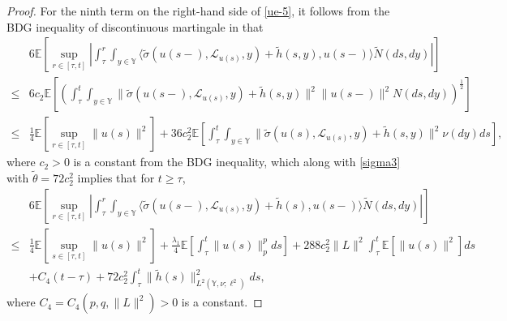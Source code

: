 \documentclass[11pt]{article}
\numberwithin{equation}{section}
\theoremstyle{plain}
\begin{document}
\begin{proof}
 For the ninth term on the right-hand side of \eqref{ue-5},
 it follows from the BDG inequality of discontinuous martingale in \cite[Theorem 3.50]{PZ2007} that
  \begin{align}\label{ue-8}
        & 
        6 \mathbb{E}
                \left[ \sup_{r \in [\tau, t]}
                       \left| 
                             \int_{\tau}^{r}
                              \int_{y \in \mathbb{Y}}
                \langle
              \widetilde{\sigma}(u(s-), \mathcal{L}_{u(s)},y) +  \widetilde{h}(s,y), 
                       u(s-) \rangle
               \widetilde{N}(ds, dy) 
                        \right|
                \right]   
           \nonumber \\
            \le & 6 c_2 
          \mathbb{E}
                \left[   \left (
                             \int_{\tau}^{t}
                              \int_{y \in \mathbb{Y}}
              \|
              \widetilde{\sigma}(u(s-), \mathcal{L}_{u(s)},y) +  \widetilde{h}(s,y)\|^2
                       \|u(s-) \|^2
              {N}(ds, dy)  
              \right )^{\frac 12}
                \right]   
             \nonumber \\
      \le & \frac{1}{4}
           \mathbb{E}
              \left[ \sup_{r \in [\tau, t]} \| u(s)\|^2 \right]
           + 36 c_2^2 \mathbb{E}
               \left[  
                         \int_{\tau}^{t} \int_{y \in \mathbb{Y} }
                               \| \widetilde{\sigma}(u(s), \mathcal{L}_{u(s)},y) + \widetilde{h}(s,y) \|^2
                         \nu (dy)ds
               \right],
  \end{align}
 where $c_2>0$ is a constant
 from the BDG inequality,
 which along with 
  \eqref{sigma3} with $\tilde{\theta}=72 c_2^2  $ implies that for $t\ge \tau$,
 \begin{align}\label{ue-9}
            & 
        6 \mathbb{E}
                \left[ \sup_{r \in [\tau, t]}
                       \left| 
                             \int_{\tau}^{r}
                              \int_{y \in \mathbb{Y}}
                \langle
              \widetilde{\sigma}(u(s-), \mathcal{L}_{u(s)},y) +  \widetilde{h}(s), 
                       u(s-) \rangle
               \widetilde{N}(ds, dy) 
                        \right|
                \right]   
           \nonumber \\
        \le & \frac{1}{4}
           \mathbb{E}
              \left[ \sup_{s \in [\tau, t]} \| u(s)\|^2 \right]
          + \frac{\lambda_1}{4}
               \mathbb{E}
                  \left[ \int_{\tau}^{t} \| u(s) \|^p_p ds
                  \right]
          +  288 c_2^2   \|L\|^2
              \int_{\tau}^{t} \mathbb{E} \left[ \| u(s) \|^2 \right] ds
                    \nonumber \\
        & + C_4  (t-\tau)
          + 72 c_2^2  
            \int_{\tau}^{t} 
            \|\widetilde{h}(s)\|^2
             _{L^2(\mathbb{Y}, \nu; \ell^2)} ds,
 \end{align}
 where $C_4 = C_4(p, q, \|L\|^2) > 0$ is a constant.



\end{proof}
\end{document}
